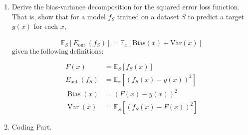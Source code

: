 \documentclass[
	12pt, %
]{fphw}
\begin{document}
\begin{problem}
	\begin{enumerate}
	\itemsep0.3em
	\parskip0.3em
	\item Derive the bias-variance decomposition for the squared error loss function. That is, show that for a model $f_S$ trained on a dataset $S$ to predict a target $y(x)$ for each $x$,

	$$
	\begin{aligned}\mathbb{E}_{S}\left[E_{\mathrm{out}}\:(f_{S})\right]=\mathbb{E}_{x}[\mathrm{Bias}(x)+\mathrm{Var}(x)]\end{aligned}
	$$
	$\mathrm{given~the~following~definitions: }$

$$
\begin{aligned}
F(x)& =\mathbb{E}_{S}\left[f_{S}(x)\right]  \\
E_{\mathrm{out}}\:(f_{S})& =\mathbb{E}_x\left[\left(f_S(x)-y(x)\right)^2\right]  \\
\operatorname{Bias}(x)& =(F(x)-y(x))^{2}  \\
\operatorname{Var}(x)& =\mathbb{E}_{S}\left[(f_{S}(x)-F(x))^{2}\right] 
\end{aligned}
$$

	\item Coding Part.
  
	

\end{enumerate}
\end{problem}

\end{document}
